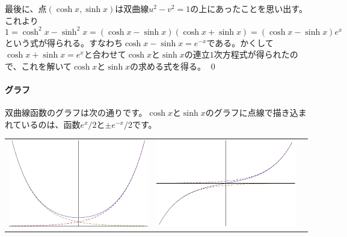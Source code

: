 最後に、点$(\cosh x,\sinh x)$は双曲線$u^2-v^2=1$の上にあったことを思い出す。これより
\[
1 = \cosh^2 x - \sinh ^2 x = (\cosh x - \sinh x)(\cosh x + \sinh x) = (\cosh x - \sinh x ) e^x
\]
という式が得られる。すなわち$\cosh x - \sinh x = e^{-x}$である。かくして$\cosh x + \sinh x = e^x$と合わせて$\cosh x$と$\sinh x$の連立$1$次方程式が得られたので、これを解いて$\cosh x$と$\sinh x$の求める式を得る。 \qed

\paragraph{グラフ}  双曲線函数のグラフは次の通りです。$\cosh x$と$\sinh x$のグラフに点線で描き込まれているのは、函数$e^x / 2$と$\pm e^{-x} / 2$です。
\begin{table}[h!tbp]
\begin{center}
\begin{tabular}{ccc}
\includegraphics[width = 50 truemm]{20150422-fig-cosh.pdf} &
\includegraphics[width = 50 truemm]{20150422-fig-sinh.pdf} &

\end{tabular}
\end{center}
\end{table}
